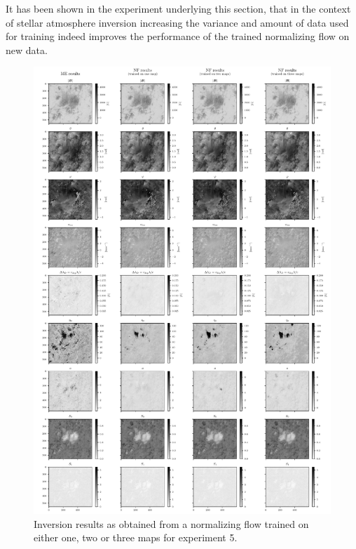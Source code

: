 \documentclass[a4paper,11pt]{report}
\def\lk#1{{\color{black}{#1}}}
\begin{document}

It has been shown in the experiment underlying this section, that in the context of stellar atmosphere inversion\lk{s} increasing the variance and amount of data used for training indeed improves the performance of the trained normalizing flow on new data.

\begin{figure}[h]
\centering
\includegraphics[height=\textheight-1cm]{figures/nf-milne-eddington-example-5-nflows-piecewisequadratic-comp-ME-NF-map19.pdf}
\caption{Inversion results as obtained from a normalizing flow trained on either one, two or three maps for experiment 5.}
\label{fig:nf-milne-eddington-example-5-nflows-piecewisequadratic-comp-ME-NF-map19}
\end{figure}
\end{document}
